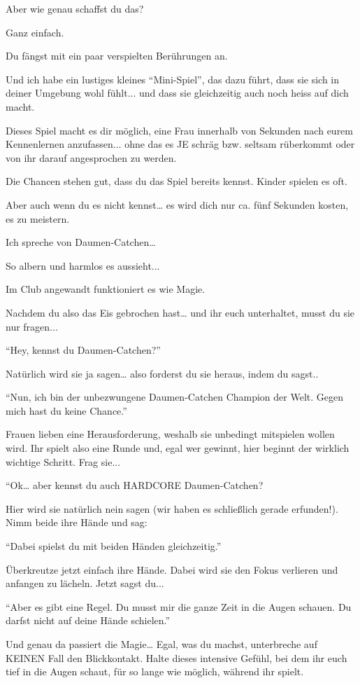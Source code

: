 Aber wie genau schaffst du das?

Ganz einfach.

Du fängst mit ein paar verspielten Berührungen an.

Und ich habe ein lustiges kleines “Mini-Spiel”, das dazu führt, dass sie sich in deiner Umgebung wohl fühlt... und dass sie gleichzeitig auch noch heiss auf dich macht.

Dieses Spiel macht es dir möglich, eine Frau innerhalb von Sekunden nach eurem Kennenlernen anzufassen... ohne das es JE schräg bzw. seltsam rüberkommt oder von ihr darauf angesprochen zu werden.

Die Chancen stehen gut, dass du das Spiel bereits kennst. Kinder spielen es oft.

Aber auch wenn du es nicht kennst… es wird dich nur ca. fünf Sekunden kosten, es zu meistern.

Ich spreche von Daumen-Catchen…

So albern und harmlos es aussieht...

Im Club angewandt funktioniert es wie Magie.

Nachdem du also das Eis gebrochen hast… und ihr euch unterhaltet, musst du sie nur fragen...

“Hey, kennst du Daumen-Catchen?”

Natürlich wird sie ja sagen… also forderst du sie heraus, indem du sagst.. 

“Nun, ich bin der unbezwungene Daumen-Catchen Champion der Welt. Gegen mich hast du keine Chance.”

Frauen lieben eine Herausforderung, weshalb sie unbedingt mitspielen wollen wird. Ihr spielt also eine Runde und, egal wer gewinnt, hier beginnt der wirklich wichtige Schritt. Frag sie...

“Ok… aber kennst du auch HARDCORE Daumen-Catchen?

Hier wird sie natürlich nein sagen (wir haben es schließlich gerade erfunden!). Nimm beide ihre Hände und sag:

“Dabei spielst du mit beiden Händen gleichzeitig.”

Überkreutze jetzt einfach ihre Hände. Dabei wird sie den Fokus verlieren und
anfangen zu lächeln. Jetzt sagst du...

“Aber es gibt eine Regel. Du musst mir die ganze Zeit in die Augen schauen. Du darfst nicht auf deine Hände schielen.”

Und genau da passiert die Magie…
Egal, was du machst, unterbreche auf KEINEN Fall den Blickkontakt. Halte dieses intensive Gefühl, bei dem ihr euch tief in die Augen schaut, für so lange wie möglich, während ihr spielt.

